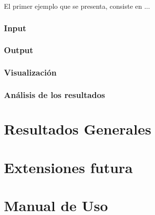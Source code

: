 El primer ejemplo que se presenta, consiste en ...


\subsubsection{Input}

\subsubsection{Output}

\subsubsection{Visualizaci\'on}

\subsubsection{An\'alisis de los resultados}
%  


\section{Resultados Generales}

\section{Extensiones futura}

\section{Manual de Uso}
